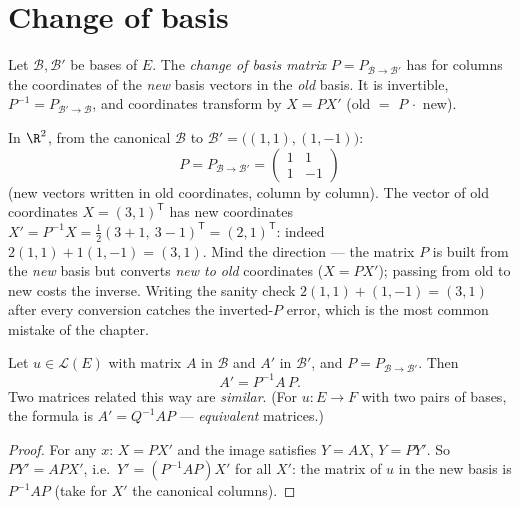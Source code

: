 \section{Change of basis}

\begin{definition}\label{def:b1:matrices:changeofbasis}
Let $\mathcal{B}, \mathcal{B}'$ be bases of $E$. The \emph{change of
basis matrix} $P =
P_{\mathcal{B}\to\mathcal{B}'}$ has for columns the coordinates of
the \emph{new} basis vectors in the \emph{old} basis. It is
invertible, $P^{-1} = P_{\mathcal{B}'\to\mathcal{B}}$, and
coordinates transform by $X = PX'$ (old $=$ $P\,\cdot$ new).
\end{definition}

\begin{example}
\label{ex:b1:matrices:changerun}
In $\R^2$, from the canonical $\mathcal B$ to $\mathcal B' =
\bigl((1,1), (1,-1)\bigr)$:
\[
P = P_{\mathcal B\to\mathcal B'} =
\begin{pmatrix} 1 & 1\\ 1 & -1 \end{pmatrix}
\]
(new vectors written in old coordinates, column by column). The
vector of old coordinates $X = (3, 1)^{\mathsf T}$ has new
coordinates $X' = P^{-1}X = \frac12(3 + 1,\ 3 - 1)^{\mathsf T} =
(2, 1)^{\mathsf T}$: indeed $2(1,1) + 1(1,-1) = (3,1)$. Mind the
direction --- the matrix $P$ is built from the \emph{new} basis
but converts \emph{new to old} coordinates ($X = PX'$); passing
from old to new costs the inverse. Writing the sanity check
$2(1,1) + (1,-1) = (3,1)$ after every conversion catches the
inverted-$P$ error, which is the most common mistake of the
chapter.
\end{example}

\begin{theorem}\label{thm:b1:matrices:conjugation}
Let $u \in \mathcal{L}(E)$ with matrix $A$ in $\mathcal{B}$ and $A'$
in $\mathcal{B}'$, and $P = P_{\mathcal{B}\to\mathcal{B}'}$. Then
\[
A' = P^{-1} A\, P .
\]
Two matrices related this way are \emph{similar}. (For $u \colon E \to F$ with two pairs of bases, the
formula is $A' = Q^{-1} A P$ --- \emph{equivalent}
matrices.)
\end{theorem}

\begin{proof}
For any $x$: $X = PX'$ and the image satisfies $Y = AX$, $Y = PY'$.
So $PY' = APX'$, i.e.\ $Y' = (P^{-1}AP)X'$ for all $X'$: the matrix
of $u$ in the new basis is $P^{-1}AP$ (take for $X'$ the canonical
columns).
\end{proof}

